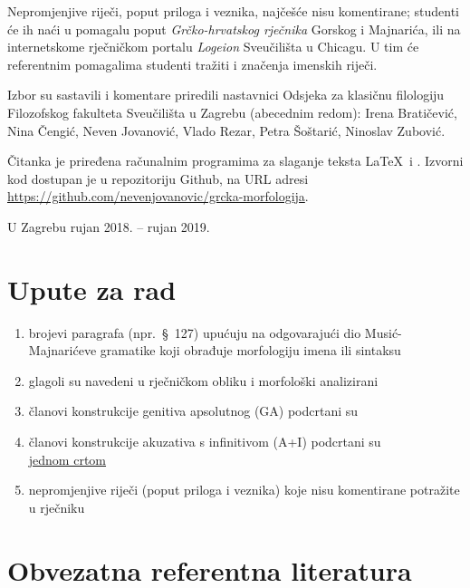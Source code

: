 \documentclass[a4paper,12pt,twoside]{report}
\begin{document}
Nepromjenjive riječi, poput priloga i veznika, najčešće nisu komentirane; studenti će ih naći u pomagalu poput \textit{Grčko-hrvatskog rječnika} Gorskog i Majnarića, ili na internetskome rječničkom portalu \textit{Logeion} Sveučilišta u Chicagu. U tim će referentnim pomagalima studenti tražiti i značenja imenskih riječi.

\newpage

Izbor su sastavili i komentare priredili nastavnici Odsjeka za klasičnu filologiju Filozofskog fakulteta Sveučilišta u Zagrebu (abecednim redom): Irena Bratičević, Nina Čengić, Neven Jovanović, Vlado Rezar, Petra Šoštarić, Ninoslav Zubović.

Čitanka je priređena računalnim programima za slaganje teksta \LaTeX\ i \XeLaTeX. Izvorni kod dostupan je u repozitoriju Github, na URL adresi \url{https://github.com/nevenjovanovic/grcka-morfologija}.

\medskip

U Zagrebu rujan 2018. – rujan 2019.

\newpage



\section*{Upute za rad}

\begin{enumerate}[label=\alph*)]
\item brojevi paragrafa (npr.\ §~127) upućuju na odgovarajući dio Musić-Majnarićeve gramatike koji obrađuje morfologiju imena ili sintaksu
\item glagoli su navedeni u rječničkom obliku i morfološki analizirani
\item članovi konstrukcije genitiva apsolutnog (GA) podcrtani su \\
\item članovi konstrukcije akuzativa s infinitivom (A+I) podcrtani su \\ \underline{jednom crtom}
\item nepromjenjive riječi (poput priloga i veznika) koje nisu komentirane potražite u rječniku
\end{enumerate}


\section*{Obvezatna referentna literatura}
\end{document}
